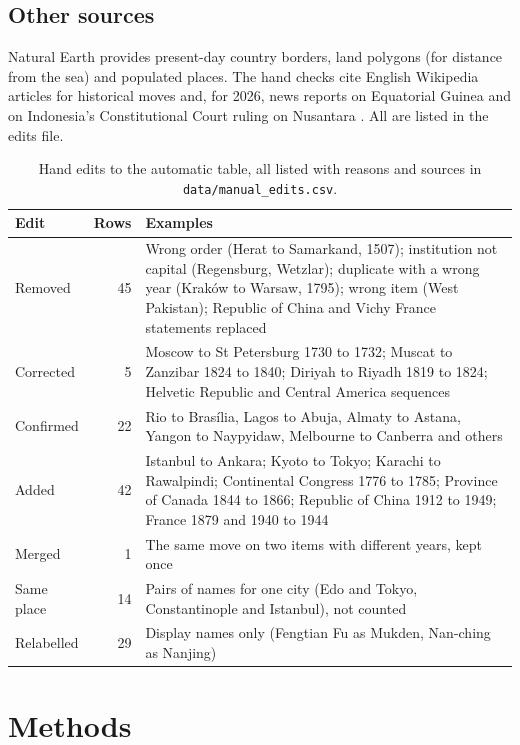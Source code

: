 \documentclass[11pt,a4paper]{article}
\begin{document}
\subsection{Other sources}
Natural Earth \citep{naturalearth} provides present-day country borders, land polygons (for distance from the sea) and populated places. The hand checks cite English Wikipedia articles for historical moves and, for 2026, news reports on Equatorial Guinea \citep{africanews} and on Indonesia's Constitutional Court ruling on Nusantara \citep{star,jakpost}. All are listed in the edits file.

\begin{table}[tbp]\centering\small\caption{Hand edits to the automatic table, all listed with reasons and sources in \texttt{data/manual\_edits.csv}.}\label{tab:edits}\begin{tabular}{>{\raggedright\arraybackslash}p{2.4cm}r>{\raggedright\arraybackslash}p{10.2cm}}\toprule Edit & Rows & Examples\\\midrule
Removed & 45 & Wrong order (Herat to Samarkand, 1507); institution not capital (Regensburg, Wetzlar); duplicate with a wrong year (Kraków to Warsaw, 1795); wrong item (West Pakistan); Republic of China and Vichy France statements replaced\\
Corrected & 5 & Moscow to St Petersburg 1730 to 1732; Muscat to Zanzibar 1824 to 1840; Diriyah to Riyadh 1819 to 1824; Helvetic Republic and Central America sequences\\
Confirmed & 22 & Rio to Brasília, Lagos to Abuja, Almaty to Astana, Yangon to Naypyidaw, Melbourne to Canberra and others\\
Added & 42 & Istanbul to Ankara; Kyoto to Tokyo; Karachi to Rawalpindi; Continental Congress 1776 to 1785; Province of Canada 1844 to 1866; Republic of China 1912 to 1949; France 1879 and 1940 to 1944\\
Merged & 1 & The same move on two items with different years, kept once\\
Same place & 14 & Pairs of names for one city (Edo and Tokyo, Constantinople and Istanbul), not counted\\
Relabelled & 29 & Display names only (Fengtian Fu as Mukden, Nan-ching as Nanjing)\\
\bottomrule\end{tabular}\end{table}

\section{Methods}
\end{document}
